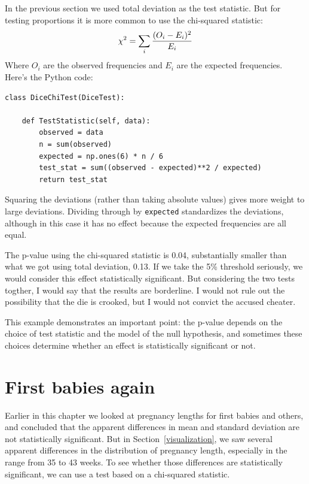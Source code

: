 \documentclass[12pt]{book}
\begin{document}
In the previous section we used total deviation as the test statistic.
But for testing proportions it is more common to use the chi-squared
statistic:
%
\[ \chi^2 = \sum_i \frac{(O_i - E_i)^2}{E_i} \]
%
% 
Where $O_i$ are the observed frequencies and $E_i$ are the expected
frequencies.  Here's the Python code:

\begin{verbatim}
class DiceChiTest(DiceTest):

    def TestStatistic(self, data):
        observed = data
        n = sum(observed)
        expected = np.ones(6) * n / 6
        test_stat = sum((observed - expected)**2 / expected)
        return test_stat
\end{verbatim}

Squaring the deviations (rather than taking absolute values) gives
more weight to large deviations.  Dividing through by {\tt expected}
standardizes the deviations, although in this case it has no effect
because the expected frequencies are all equal.

The p-value using the chi-squared statistic is 0.04,
substantially smaller than what we got using total deviation, 0.13.
If we take the 5\% threshold seriously, we would consider this effect
statistically significant.  But considering the two tests togther, I
would say that the results are borderline.  I would not rule out the
possibility that the die is crooked, but I would not convict the
accused cheater.
   

This example demonstrates an important point: the p-value depends
on the choice of test statistic and the model of the null hypothesis,
and sometimes these choices determine whether an effect is
statistically significant or not.


\section{First babies again}

Earlier in this chapter we looked at pregnancy lengths for first
babies and others, and concluded that the apparent differences in
mean and standard deviation are not statistically significant.  But in
Section~\ref{visualization}, we saw several apparent differences
in the distribution of pregnancy length, especially in the range from
35 to 43 weeks.  To see whether those differences are statistically
significant, we can use a test based on a chi-squared statistic.
 
\end{document}
